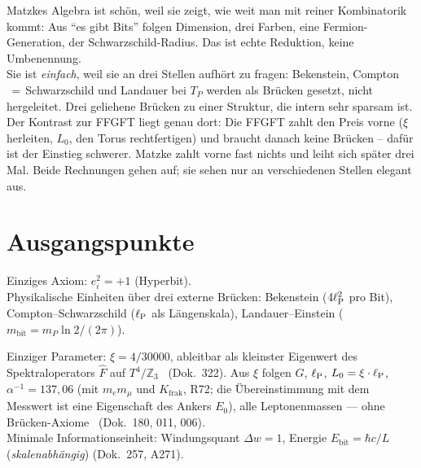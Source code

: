 \begin{tcolorbox}[convbox, title={Die kürzeste Fassung}]
  Matzkes Algebra ist schön, weil sie zeigt, wie weit man mit reiner
  Kombinatorik kommt: Aus \enquote{es gibt Bits} folgen Dimension,
  drei Farben, eine Fermion-Generation, der Schwarzschild-Radius.
  Das ist echte Reduktion, keine Umbenennung.\\[4pt]
  Sie ist \emph{einfach}, weil sie an drei Stellen aufhört zu fragen:
  Bekenstein, Compton$\,=\,$Schwarzschild und Landauer bei $T_P$ werden
  als Brücken gesetzt, nicht hergeleitet. Drei geliehene Brücken zu einer
  Struktur, die intern sehr sparsam ist.\\[4pt]
  Der Kontrast zur FFGFT liegt genau dort: Die FFGFT zahlt den Preis
  vorne ($\xi$ herleiten, $L_0$, den Torus rechtfertigen) und braucht
  danach keine Brücken -- dafür ist der Einstieg schwerer. Matzke zahlt
  vorne fast nichts und leiht sich später drei Mal. Beide Rechnungen
  gehen auf; sie sehen nur an verschiedenen Stellen elegant aus.
\end{tcolorbox}

\section{Ausgangspunkte}

\begin{tcolorbox}[matzbox, title={Matzke}]
  Einziges Axiom: $e_i^2 = +1$ (Hyperbit). \SETZ\\
  Physikalische Einheiten über drei externe Brücken:
  Bekenstein ($4\ell_{\mathrm{P}}^2$ pro Bit), Compton–Schwarzschild ($\ell_{\mathrm{P}}$ als Längenskala),
  Landauer–Einstein ($m_{\mathrm{bit}} = m_P \ln 2/(2\pi)$).
\end{tcolorbox}

\begin{tcolorbox}[ffgftbox, title={FFGFT}]
  Einziger Parameter: $\xi = 4/30000$, ableitbar als kleinster Eigenwert des
  Spektraloperators $\hat{F}$ auf $T^4/\mathbb{Z}_3$ \K\ (Dok.\ 322).
  Aus $\xi$ folgen $G$, $\ell_{\mathrm{P}}$, $L_0 = \xi\cdot\ell_{\mathrm{P}}$, $\alpha^{-1} = 137{,}06$ (mit $m_e m_\mu$ und $K_{\text{frak}}$, R72; die Übereinstimmung mit dem Messwert ist eine Eigenschaft des Ankers $E_0$),
  alle Leptonenmassen — ohne Brücken-Axiome \K\ (Dok.\ 180, 011, 006).\\
  Minimale Informationseinheit: Windungsquant $\Delta w = 1$, Energie $E_{\mathrm{bit}} = \hbar c/L$
  (\emph{skalenabhängig}) (Dok.\ 257, A271).
\end{tcolorbox}

